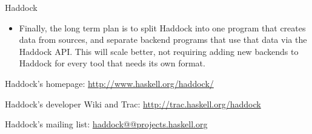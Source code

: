 \begin{hcarentry}[updated]{Haddock}
\begin{itemize}
\item Finally, the long term plan is to split Haddock into one program that creates
data from sources, and separate backend programs that use that data via the
Haddock API. This will scale better, not requiring adding new backends to Haddock
for every tool that needs its own format.
\end{itemize}

\FurtherReading
\begin{compactitem}
\item Haddock's homepage:
\url{http://www.haskell.org/haddock/}

\item Haddock's developer Wiki and Trac:
\url{http://trac.haskell.org/haddock}

\item Haddock's mailing list:
\url{haddock@@projects.haskell.org}
\end{compactitem}
\end{hcarentry}
